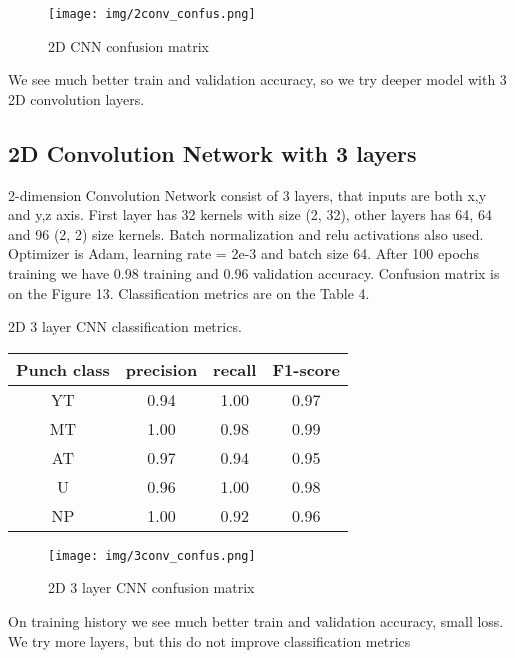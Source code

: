 \documentclass[sport,article,submit,moreauthors,pdftex]{Definitions/mdpi}
\begin{document}
\begin{figure}[H]
\texttt{[image: img/2conv\_confus.png]}
\caption{2D CNN confusion matrix}
\end{figure}


We see much better train and validation accuracy, so we try deeper model with 3 2D convolution layers.


\subsection{2D Convolution Network with 3 layers}

2-dimension Convolution Network consist of 3 layers, that inputs are both x,y and y,z axis. First layer has 32 kernels with size (2, 32), other layers has 64, 64 and 96 (2, 2) size kernels. Batch normalization and relu activations also used.
Optimizer is Adam, learning rate = 2e-3 and batch size 64. After 100 epochs training we have 0.98 training and 0.96 validation accuracy. Confusion matrix is on the Figure 13. Classification metrics are on the Table 4.
\begin{specialtable}[H]
\caption{2D 3 layer CNN classification metrics.\label{tab4}}
\begin{tabular}{cccc}
\toprule
\textbf{Punch class}	& \textbf{precision}	& \textbf{recall}	& \textbf{F1-score} \\
\midrule
YT		& 0.94		& 1.00		& 0.97 \\
MT		& 1.00		& 0.98		& 0.99 \\
AT		& 0.97		& 0.94		& 0.95 \\
U		& 0.96		& 1.00		& 0.98 \\
NP		& 1.00		& 0.92		& 0.96 \\
\bottomrule
\end{tabular}
\end{specialtable}

\begin{figure}[H]
\texttt{[image: img/3conv\_confus.png]}
\caption{2D 3 layer CNN confusion matrix}
\end{figure}

On training history we see much better train and validation accuracy, small loss. We try more layers, but this do not improve classification metrics
\end{document}
